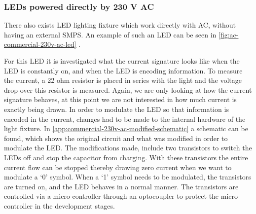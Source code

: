 
\subsubsection{LEDs powered directly by 230 V AC}


There also exists LED lighting fixture which work directly with AC, without having an external SMPS.
An example of such an LED can be seen in \autoref{fig:ac-commercial-230v-ac-led} \cite{commercial-230v-ac-led-aliexpress}.



For this LED it is investigated what the current signature looks like when the LED is constantly on, and when the LED is encoding information.
To measure the current, a 22 ohm resistor is placed in series with the light and the voltage drop over this resistor is measured.
Again, we are only looking at how the current signature behaves, at this point we are not interested in how much current is exactly being drawn.
In order to modulate the LED so that information is encoded in the current, changes had to be made to the internal hardware of the light fixture.
In \autoref{app:commercial-230v-ac-modified-schematic} a schematic can be found, which shows the original circuit and what was modified in order to modulate the LED.
The modifications made, include two transistors to switch the LEDs off and stop the capacitor from charging. 
With these transistors the entire current flow can be stopped thereby drawing zero current when we want to modulate a `0' symbol.
When a `1' symbol needs to be modulated, the transistors are turned on, and the LED behaves in a normal manner.
The transistors are controlled via a micro-controller through an optocoupler to protect the micro-controller in the development stages.



